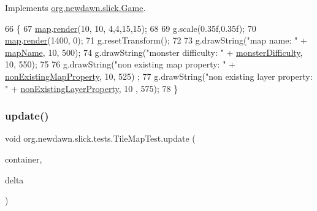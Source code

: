 Implements \mbox{\hyperlink{interfaceorg_1_1newdawn_1_1slick_1_1_game_af1a4670d43eb3ba04dfcf55ab1975b64}{org.\+newdawn.\+slick.\+Game}}.


\begin{DoxyCode}
66                                                             \{
67         \mbox{\hyperlink{classorg_1_1newdawn_1_1slick_1_1tests_1_1_tile_map_test_a9556866283ab0588cbdf6c5b52c20a27}{map}}.\mbox{\hyperlink{classorg_1_1newdawn_1_1slick_1_1tiled_1_1_tiled_map_a313dd901616b31c772f213675d236389}{render}}(10, 10, 4,4,15,15);
68         
69         g.scale(0.35f,0.35f);
70         \mbox{\hyperlink{classorg_1_1newdawn_1_1slick_1_1tests_1_1_tile_map_test_a9556866283ab0588cbdf6c5b52c20a27}{map}}.\mbox{\hyperlink{classorg_1_1newdawn_1_1slick_1_1tiled_1_1_tiled_map_a313dd901616b31c772f213675d236389}{render}}(1400, 0);
71         g.resetTransform();
72         
73         g.drawString(\textcolor{stringliteral}{"map name: "} + \mbox{\hyperlink{classorg_1_1newdawn_1_1slick_1_1tests_1_1_tile_map_test_aea368a6a5d3db9b818166ed67000bc76}{mapName}}, 10, 500);
74         g.drawString(\textcolor{stringliteral}{"monster difficulty: "} + \mbox{\hyperlink{classorg_1_1newdawn_1_1slick_1_1tests_1_1_tile_map_test_ae6006a02123c6cb2a3f90ffc723087c7}{monsterDifficulty}}, 10, 550);
75         
76         g.drawString(\textcolor{stringliteral}{"non existing map property: "} + \mbox{\hyperlink{classorg_1_1newdawn_1_1slick_1_1tests_1_1_tile_map_test_aa74d0924f7116aa7b47afad19fa79eb8}{nonExistingMapProperty}}, 10, 525)
      ;
77         g.drawString(\textcolor{stringliteral}{"non existing layer property: "} + \mbox{\hyperlink{classorg_1_1newdawn_1_1slick_1_1tests_1_1_tile_map_test_aa73bda53fe33e9b901e147425469cfc6}{nonExistingLayerProperty}}, 10
      , 575);
78     \}
\end{DoxyCode}
\mbox{\label{classorg_1_1newdawn_1_1slick_1_1tests_1_1_tile_map_test_a919f1dbc82723fa715959c1d49cd802f}} 
\subsubsection{\texorpdfstring{update()}{update()}}
{\footnotesize\ttfamily void org.\+newdawn.\+slick.\+tests.\+Tile\+Map\+Test.\+update (\begin{DoxyParamCaption}\item[{\mbox{\hyperlink{classorg_1_1newdawn_1_1slick_1_1_game_container}{Game\+Container}}}]{container,  }\item[{int}]{delta }\end{DoxyParamCaption})\hspace{0.3cm}{\ttfamily [inline]}}

